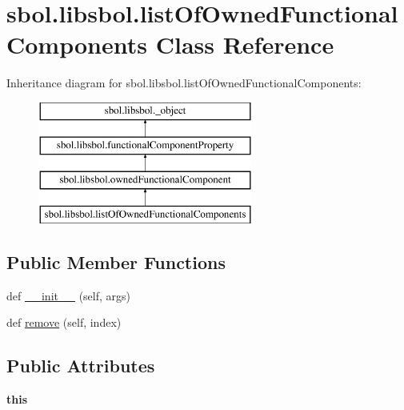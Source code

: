\hypertarget{classsbol_1_1libsbol_1_1list_of_owned_functional_components}{}\section{sbol.\+libsbol.\+list\+Of\+Owned\+Functional\+Components Class Reference}
\label{classsbol_1_1libsbol_1_1list_of_owned_functional_components}
Inheritance diagram for sbol.\+libsbol.\+list\+Of\+Owned\+Functional\+Components\+:\begin{figure}[H]
\begin{center}
\leavevmode
\includegraphics[height=4.000000cm]{classsbol_1_1libsbol_1_1list_of_owned_functional_components}
\end{center}
\end{figure}
\subsection*{Public Member Functions}
\begin{DoxyCompactItemize}
\item 
def \hyperlink{classsbol_1_1libsbol_1_1list_of_owned_functional_components_af0b2a415e4bf2e45c34c522c71a2bce7}{\+\_\+\+\_\+init\+\_\+\+\_\+} (self, args)
\item 
def \hyperlink{classsbol_1_1libsbol_1_1list_of_owned_functional_components_adc82fb9d19fa1c4d4e88d0080b9c11dc}{remove} (self, index)
\end{DoxyCompactItemize}
\subsection*{Public Attributes}
\begin{DoxyCompactItemize}
\item 
{\bfseries this}\hypertarget{classsbol_1_1libsbol_1_1list_of_owned_functional_components_a0eb7dcb9005fa180fcb396b1937d5464}{}\label{classsbol_1_1libsbol_1_1list_of_owned_functional_components_a0eb7dcb9005fa180fcb396b1937d5464}

\end{DoxyCompactItemize}
